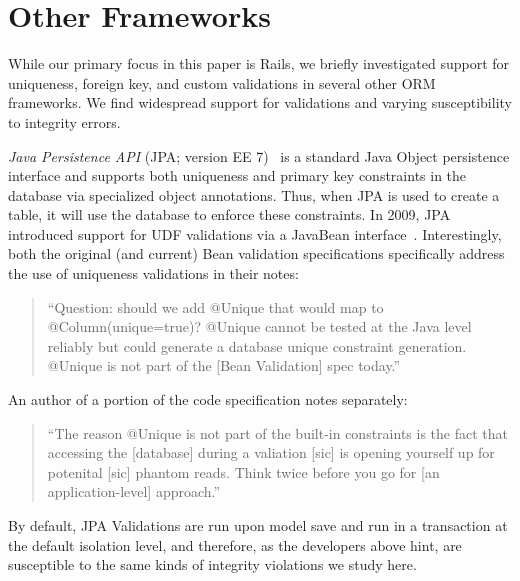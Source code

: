 
\section{Other Frameworks}
\label{sec:other-orms}

While our primary focus in this paper is Rails, we briefly investigated
support for uniqueness, foreign key, and custom validations in several
other ORM frameworks. We find widespread support for validations and
varying susceptibility to integrity errors.

\newcommand{\orm}[1]{{\vspace{.45em}\noindent\textit{#1}}}

\orm{Java Persistence API} (JPA; version EE 7)~\cite{code-jpa} is a
standard Java Object persistence interface and supports both
uniqueness and primary key constraints in the database via specialized
object annotations. Thus, when JPA is used to create a table, it will
use the database to enforce these constraints. In 2009, JPA introduced
support for UDF validations via a JavaBean
interface~\cite{code-bean-validation}. Interestingly, both the
original (and current) Bean validation specifications specifically
address the use of uniqueness validations in their notes:\vspace{-.25em}
\begin{quote}
``Question: should we add @Unique that would map to @Column(unique=true)?
@Unique cannot be tested at the Java level reliably but could generate
a database unique constraint generation. @Unique is not part
of the [Bean Validation] spec today.''~\cite{jsr-bean}\vspace{-.25em}
\end{quote}
An author of a portion of the code specification notes separately:\vspace{-.25em}
\begin{quote}
  ``The reason @Unique is not part of the built-in constraints is the
  fact that accessing the [database] during a valiation [sic] is
  opening yourself up for potenital [sic] phantom reads. Think twice
  before you go for [an application-level] approach.''~\cite{unique-bean}\vspace{-.25em}
\end{quote}
By default, JPA Validations are run upon model save and run in a
transaction at the default isolation level, and therefore, as the
developers above hint, are susceptible to the same kinds of integrity
violations we study here.

